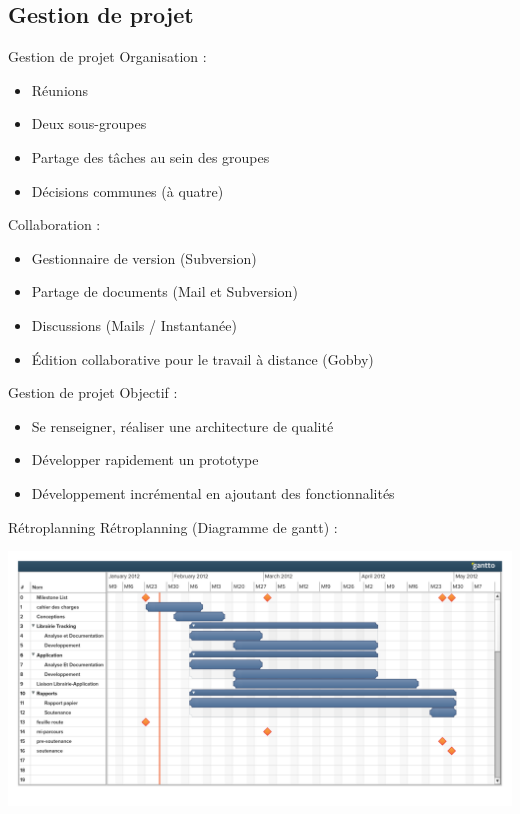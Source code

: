 \documentclass{beamer}
\begin{document}
	\subsection{Gestion de projet}
		\begin{frame}{Gestion de projet}
		Organisation :
			\begin{itemize}
				\item{Réunions}
				\item{Deux sous-groupes}
				\item{Partage des tâches au sein des groupes}
				\item{Décisions communes (à quatre)}
			\end{itemize}
		
		Collaboration :
			\begin{itemize}
				\item{Gestionnaire de version (Subversion)}
				\item{Partage de documents (Mail et Subversion)}
				\item{Discussions (Mails / Instantanée)}
				\item{Édition collaborative pour le travail à distance (Gobby)}
			\end{itemize}
		\end{frame}
		
		\begin{frame}{Gestion de projet}
			Objectif :
			\begin{itemize}
			\item Se renseigner, réaliser une architecture de qualité
			\item Développer rapidement un prototype
			\item Développement incrémental en ajoutant des fonctionnalités
			\end{itemize} 
		\end{frame}
		
		\begin{frame}{Rétroplanning}	
			Rétroplanning (Diagramme de gantt) :
			\begin{center}
			\includegraphics[scale=0.25]{../feuille-route/retroplanning.pdf}
			\end{center}
		\end{frame}
	
\end{document}
